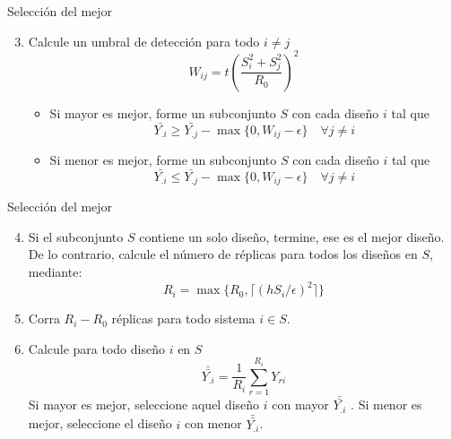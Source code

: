 \begin{frame}{Selección del mejor}
    \begin{enumerate}\setcounter{enumi}{2}
        \item Calcule un umbral de detección para todo $i\neq j$
            \[W_{ij}=t\left(\frac{S_i^2+S_j^2}{R_0}\right)^2\]
        \begin{itemize}
            \item Si mayor es mejor, forme un subconjunto $S$ con cada diseño $i$ tal que
            	\[\bar{Y_{.i}}\geq \bar{Y_{.j}}-\max \{0, W_{ij}-\epsilon\} \quad \forall j\neq i\]
            \item Si menor es mejor, forme un subconjunto $S$ con cada diseño $i$ tal que
            	\[\bar{Y_{.i}}\leq \bar{Y_{.j}}-\max \{0, W_{ij}-\epsilon\} \quad \forall j\neq i\]
        \end{itemize}
    \end{enumerate}
\end{frame}

\begin{frame}{Selección del mejor}
	\begin{enumerate}\setcounter{enumi}{3}
        \item Si el subconjunto $S$ contiene un solo diseño, termine, ese es el mejor diseño. De lo contrario, calcule el número de réplicas para todos los diseños en $S$, mediante:
        \[R_i=\max \{R_0,\lceil \left(hS_i/\epsilon\right)^2 \rceil \}\]
        \item Corra $R_i-R_0$ réplicas para todo sistema $i\in S$.
        \item Calcule para todo diseño $i$ en $S$
        \[\bar{\bar{Y_{.i}}}=\frac{1}{R_i}\sum_{r=1}^{R_i}{Y_{ri}}\]
        Si mayor es mejor, seleccione aquel diseño $i$ con mayor $\bar{\bar{Y_{.i}}}$ . Si menor es mejor, seleccione el diseño $i$ con menor $\bar{\bar{Y_{.i}}}$.
    \end{enumerate}
\end{frame}